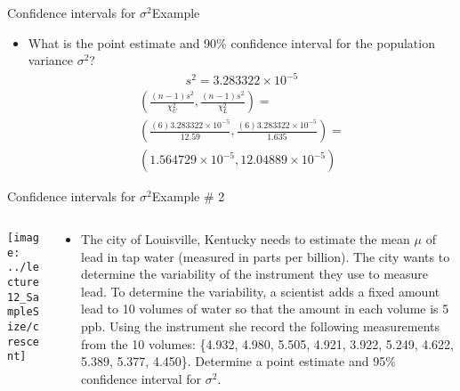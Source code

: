 \documentclass[xcolor=dvipsnames]{beamer}
\begin{document}
\begin{frame}{Confidence intervals for $\sigma^2$}{Example}
	\begin{itemize}
		\item What is the point estimate and 90\% confidence interval for the population variance $\sigma^2$?
		\begin{gather*}
		s^2 = 3.283322 \times 10^{-5}
		\end{gather*}
		\begin{gather*}
		\left(\frac{(n-1) s^2}{\chi_U^2}, \frac{(n-1)s^2}{\chi_L^2} \right) = \\
		\left(\frac{(6) 3.283322 \times 10^{-5}}{12.59}, \frac{(6)3.283322 \times 10^{-5}}{1.635} \right) = \\
		(1.564729  \times 10^{-5}, 12.04889  \times 10^{-5})
		\end{gather*}
	\end{itemize}
\end{frame}

\begin{frame}{Confidence intervals for $\sigma^2$}{Example \# 2}
	\begin{columns}
		\begin{column}{.4 \textwidth}
			\texttt{[image: ../lecture12\_SampleSize/crescent]}
		\end{column}
		\begin{column}{.6 \textwidth}
			\vspace{-5mm}
				\begin{itemize}
				\item The city of Louisville, Kentucky needs to estimate the mean $\mu$ of lead in tap water (measured in parts per billion). The city wants to determine the variability of the instrument they use to measure lead. To determine the variability, a scientist adds a fixed amount lead to 10 volumes of water so that the amount in each volume is 5 ppb. Using the instrument she record the following measurements from the 10 volumes: \{4.932, 4.980, 5.505, 4.921, 3.922, 5.249, 4.622, 5.389, 5.377, 4.450\}. Determine a point estimate and 95\% confidence interval for $\sigma^2$.
			\end{itemize}
		\end{column}
	\end{columns}
\end{frame}
\end{document}

